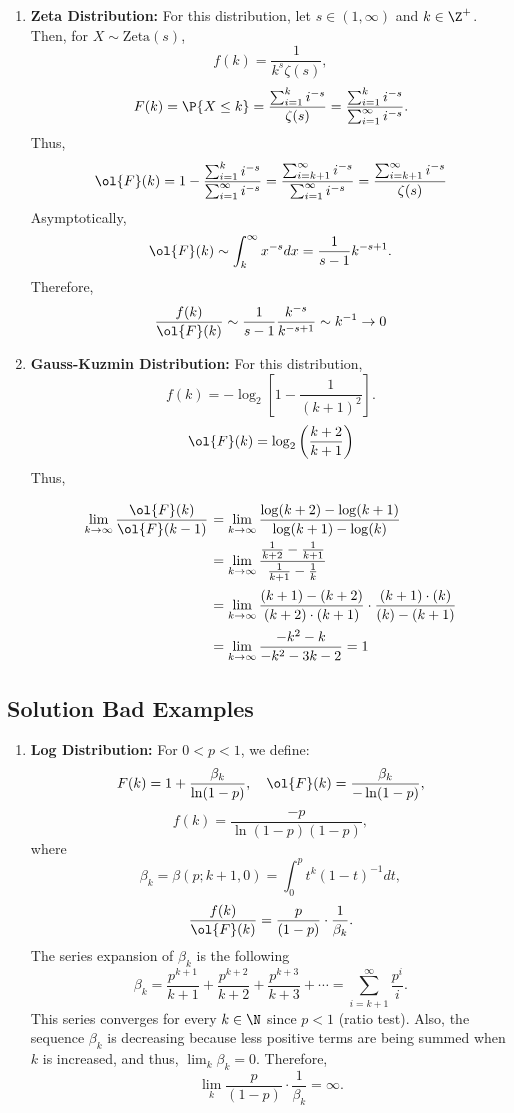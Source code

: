 \begin{enumerate}
    \item \textbf{Zeta Distribution:} For this distribution, let $s \in (1,\infty)$ and $k \in \Z^+$. Then, for $X\sim \text{Zeta}(s)$,
    \[ f(k) = \frac{1}{k^s \zeta(s)}, \]
    \[ F(k) = \P\{X \leq k\} =\dfrac{\sum_{i = 1}^k i^{-s}}{\zeta(s)}= \dfrac{\sum_{i = 1}^k i^{-s}}{\sum_{i = 1}^\infty i^{-s}}.\]
    Thus,
    \[  \ol{F}(k) = 1-\dfrac{\sum_{i = 1}^k i^{-s}}{\sum_{i = 1}^\infty i^{-s}} = \dfrac{\sum_{i = k+1}^\infty i^{-s}}{\sum_{i = 1}^\infty i^{-s}} = \dfrac{\sum_{i = k+1}^\infty i^{-s}}{\zeta(s)} \]
    Asymptotically, 
    \[ \ol{F}(k) \sim \int_{k}^{\infty} x^{-s} dx = \frac{1}{s-1}k^{-s+1}.\]
    Therefore,
    \[ \frac{f(k)}{\ol{F}(k)} \sim \frac{1}{s-1} \frac{k^{-s}}{{k}^{-s+1}} \sim k^{-1} \to 0 \]
    \item \textbf{Gauss-Kuzmin Distribution:} For this distribution,
    \[ f(k) = -\log_2\left[ 1-\frac{1}{{(k+1)}^2} \right] .\]
    \[ \ol{F}(k) = \log_2\left( \frac{k+2}{k+1} \right) \]
    Thus,
    \[ \everymath{\displaystyle}
    \arraycolsep=1.8pt\def\arraystretch{2.4}
    \begin{array}{rl}
        \lim_{k\to\infty} \frac{\ol{F}(k)}{\ol{F}(k-1)} & = \lim_{k\to\infty}\frac{\log(k+2)-\log(k+1)}{\log(k+1)-\log(k)}\\
        & = \lim_{k\to\infty} \dfrac{\frac{1}{k+2} - \frac{1}{k+1}}{\frac{1}{k+1} - \frac{1}{k}}\\
        & = \lim_{k\to\infty} \frac{(k+1) - (k+2)}{(k+2)\cdot (k+1)} \cdot \frac{(k+1)\cdot (k)}{(k) - (k+1)}\\
        & = \lim_{k\to \infty} \frac{-k^2-k}{-k^2-3k-2} = 1
    \end{array}\]
\end{enumerate}

\subsection*{Solution Bad Examples}

\begin{enumerate}
    \item \textbf{Log Distribution:} For $0 <p < 1$, we define: 
    \[ F(k) = 1+\frac{\beta_k}{\ln(1-p)},\hspace*{1em} \ol{F}(k) = \frac{\beta_k}{-\ln(1-p)}, \]
    \[ f(k)= \frac{-p}{\ln(1-p)(1-p)}, \]
    where 
    \[ \beta_k = \beta(p; k+1, 0) = \int_{0}^p t^{k}{(1-t)}^{-1} dt ,\]
    \[ \frac{f(k)}{\ol{F}(k)} = \frac{p}{(1-p)} \cdot \frac{1}{\beta_k}.\]
    The series expansion of $\beta_k$ is the following
    \[ \beta_k = \frac{p^{k+1}}{k+1} + \frac{p^{k+2}}{k+2} + \frac{p^{k+3}}{k+3} + \cdots = \sum_{i = k+1}^\infty \frac{p^{i}}{i}. \]
    This series converges for every $k\in\N$ since $p < 1$ (ratio test). Also, the sequence $\beta_k$ is decreasing because less positive terms are being summed when $k$ is increased, and thus, $\lim_k \beta_k = 0$. Therefore,
    \[ \lim_k \frac{p}{(1-p)} \cdot \frac{1}{\beta_k} = \infty. \]

    
\end{enumerate}

